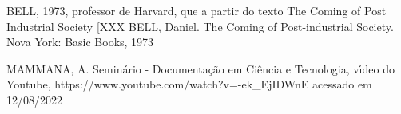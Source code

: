 \documentclass[
12pt,		%
openright,	%
twoside,  %
a4paper,			%
chapter=TITLE,		%
english,			%
french,				%
spanish,			%
brazil				%
]{USPSC-classe/USPSC_RedarTex}
\begin{document}
\begin{flushleft}
\begin{flushleft}
\begin{flushleft}
\begin{flushleft}
\begin{flushleft}
\begin{flushleft}
\begin{flushleft}
\begin{flushleft}
[BELL, 1973]  BELL, 1973, professor de Harvard, que a partir do texto The Coming of Post Industrial Society [XXX BELL, Daniel. The Coming of Post-industrial Society. Nova York: Basic Books, 1973
\end{flushleft}


\end{flushleft}


\end{flushleft}


\end{flushleft}


\end{flushleft}


\end{flushleft}


\end{flushleft}


\end{flushleft}


\begin{flushleft}
\begin{flushleft}
\begin{flushleft}
\begin{flushleft}
\begin{flushleft}
\begin{flushleft}
\begin{flushleft}
\begin{flushleft}
[MAMMANA, 2020] MAMMANA, A. Semin\'ario - Documenta\c{c}\~ao em Ci\^encia e Tecnologia, v\'{\i}deo do Youtube, https://www.youtube.com/watch?v=-ek\_EjIDWnE acessado em 12/08/2022
\end{flushleft}


\end{flushleft}


\end{flushleft}


\end{flushleft}


\end{flushleft}


\end{flushleft}


\end{flushleft}


\end{flushleft}
\end{document}
